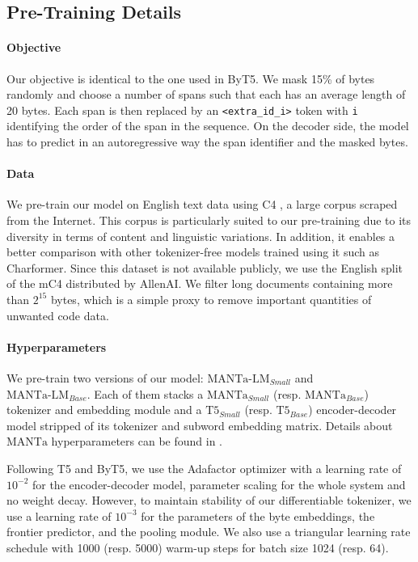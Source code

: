\subsection{Pre-Training Details}

\paragraph{Objective}
Our objective is identical to the one used in ByT5. We mask 15\% of bytes randomly and choose a number of spans such that each has an average length of 20 bytes. Each span is then replaced by an \texttt{<extra\_id\_i>} token with \texttt{i} identifying the order of the span in the sequence. On the decoder side, the model has to predict in an autoregressive way the span identifier and the masked bytes.

\paragraph{Data}
We pre-train our model on English text data using C4 \citep{raffel2020t5}, a large corpus scraped from the Internet. This corpus is particularly suited to our pre-training due to its diversity in terms of content and linguistic variations. In addition, it enables a better comparison with other tokenizer-free models trained using it such as Charformer. Since this dataset is not available publicly, we use the English split of the mC4 distributed by AllenAI. We filter long documents containing more than $2^{15}$ bytes, which is a simple proxy to remove important quantities of unwanted code data.

\paragraph{Hyperparameters}
We pre-train two versions of our model: $\text{MANTa-LM}_{Small}$ and \\
$\text{MANTa-LM}_{Base}$. Each of them stacks a $\text{MANTa}_{Small}$ (resp. $\text{MANTa}_{Base}$) tokenizer and embedding module and a $\text{T5}_{Small}$ (resp. $\text{T5}_{Base}$) encoder-decoder model stripped of its tokenizer and subword embedding matrix. Details about $\text{MANTa}$ hyperparameters can be found in .

Following T5 and ByT5, we use the Adafactor optimizer with a learning rate of $10^{-2}$ for the encoder-decoder model, parameter scaling for the whole system and no weight decay. However, to maintain stability of our differentiable tokenizer, we use a learning rate of $10^{-3}$ for the parameters of the byte embeddings, the frontier predictor, and the pooling module. We also use a triangular learning rate schedule with 1000 (resp. 5000) warm-up steps for batch size 1024 (resp. 64).

